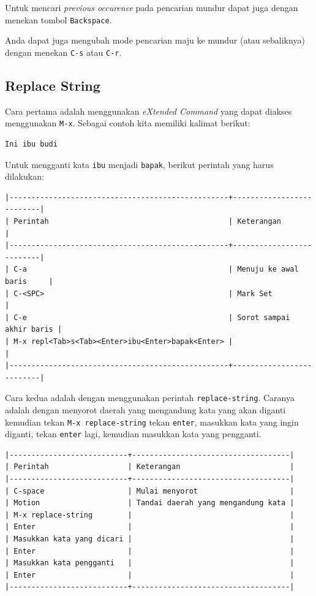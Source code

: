\documentclass{article}
\begin{document}
Untuk mencari \emph{previous occurence} pada pencarian mundur dapat juga
dengan menekan tombol \verb=Backspace=.

Anda dapat juga mengubah mode pencarian maju ke mundur (atau sebaliknya)
dengan menekan \verb=C-s= atau \verb=C-r=.

\subsection{Replace String}

Cara pertama adalah menggunakan \emph{eXtended Command} yang dapat diakses
menggunakan \verb=M-x=. Sebagai contoh kita memiliki kalimat berikut:

\begin{verbatim}
Ini ibu budi
\end{verbatim}

Untuk mengganti kata \verb=ibu= menjadi \verb=bapak=, berikut perintah yang
harus dilakukan:

\begin{verbatim}
|--------------------------------------------------+--------------------------|
| Perintah                                         | Keterangan               |
|--------------------------------------------------+--------------------------|
| C-a                                              | Menuju ke awal baris     |
| C-<SPC>                                          | Mark Set                 |
| C-e                                              | Sorot sampai akhir baris |
| M-x repl<Tab>s<Tab><Enter>ibu<Enter>bapak<Enter> |                          |
|--------------------------------------------------+--------------------------|
\end{verbatim}

Cara kedua adalah dengan menggunakan perintah \verb=replace-string=.
Caranya adalah dengan menyorot daerah yang mengandung kata yang akan diganti
kemudian tekan \verb=M-x replace-string= tekan \verb=enter=, masukkan kata
yang ingin diganti, tekan \verb=enter= lagi, kemudian masukkan kata yang
pengganti.

\begin{verbatim}
|---------------------------+------------------------------------|
| Perintah                  | Keterangan                         |
|---------------------------+------------------------------------|
| C-space                   | Mulai menyorot                     |
| Motion                    | Tandai daerah yang mengandung kata |
| M-x replace-string        |                                    |
| Enter                     |                                    |
| Masukkan kata yang dicari |                                    |
| Enter                     |                                    |
| Masukkan kata pengganti   |                                    |
| Enter                     |                                    |
|---------------------------+------------------------------------|
\end{verbatim}
\end{document}

